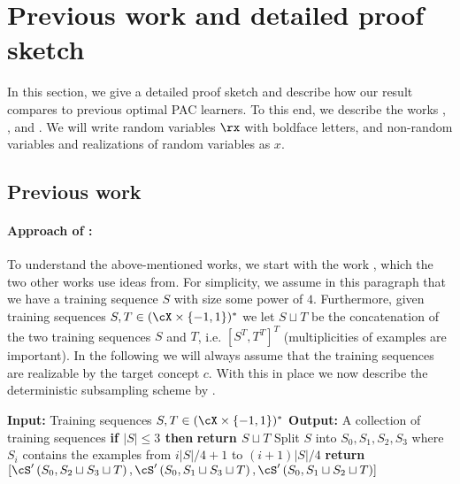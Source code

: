 \section{Previous work and detailed proof sketch}
\label{sec:proofoverview}

In this section, we give a detailed proof sketch and describe how our result compares to previous optimal PAC learners. To this end, we describe the works \cite{hannekeoptimal}, \cite{Optimalweaktostronglearning}, and \cite{baggingoptimalPAClearner}. We will write random variables  $ \rx $ with boldface letters, and non-random variables and realizations of random variables as $ x $. 
\subsection{Previous work} 
\paragraph{Approach of \cite{hannekeoptimal}:}
To understand the above-mentioned works, we start with the work \cite{hannekeoptimal}, which the two other works use ideas from. For simplicity, we assume in this paragraph that we have a training sequence $ S $ with size some power of $4$. Furthermore, given training sequences $S,T\in (\cX \times \{-1,1\})^{*}$ we let $ S\sqcup T $ be the concatenation of the two training sequences $ S $ and $ T $, i.e.   $ [S^{T},T^{T}]^{T} $ (multiplicities of examples are important). In the following we will always assume that the training sequences are realizable by the target concept $ c.$  With this in place we now describe the deterministic subsampling scheme by \cite{hannekeoptimal}. 
\begin{algorithm}[H]
  \caption{$\cS'(S,T)$}\label{alg:Subsamplehanneke}
  \begin{algorithmic}[1]
    \State \textbf{Input:} Training sequences $S ,T\in (\cX\times \{-1,1\})^{*}$ 
    \State \textbf{Output:}{ A collection of training sequences}
      \State \textbf{if $ |S|\leq 3 $ then}
      \State\hspace{0.5cm}\textbf{return $ S\sqcup T $ }
      \State Split $ S $ into  $S_0,S_{1},S_{2},S_{3}$  where $ S_i $ contains the examples from $i|S|/4+1$ to $ (i+1)|S|/4$
      \State \textbf{return}$[\cS'\left(S_0 , S_2 \sqcup S_3 \sqcup T\right) , \cS'\left(S_0 , S_1 \sqcup S_3 \sqcup T\right) , \cS'\left(S_0 , S_1 \sqcup S_2 \sqcup T\right)]$
  \end{algorithmic} 
\end{algorithm}
